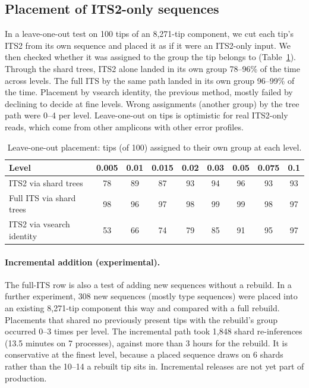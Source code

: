 \documentclass[11pt,a4paper]{article}
\begin{document}
\subsection{Placement of ITS2-only sequences}\label{sec:res-placement}

In a leave-one-out test on 100 tips of an 8,271-tip component, we cut each tip's ITS2 from its own
sequence and placed it as if it were an ITS2-only input. We then checked whether it was assigned to
the group the tip belongs to (Table~\ref{tab:placement}). Through the shard trees, ITS2 alone
landed in its own group 78--96\% of the time across levels. The full ITS by the same path landed in
its own group 96--99\% of the time. Placement by vsearch identity, the previous method, mostly
failed by declining to decide at fine levels. Wrong assignments (another group) by the tree path
were 0--4 per level. Leave-one-out on tips is optimistic for real ITS2-only reads, which come from
other amplicons with other error profiles.

\begin{table}[t]
\centering\small
\caption{Leave-one-out placement: tips (of 100) assigned to their own group at each level.}
\label{tab:placement}
\begin{tabular}{@{}lcccccccc@{}}
\toprule
Level & 0.005 & 0.01 & 0.015 & 0.02 & 0.03 & 0.05 & 0.075 & 0.1 \\
\midrule
ITS2 via shard trees & 78 & 89 & 87 & 93 & 94 & 96 & 93 & 93 \\
Full ITS via shard trees & 98 & 96 & 97 & 98 & 99 & 99 & 98 & 97 \\
ITS2 via vsearch identity & 53 & 66 & 74 & 79 & 85 & 91 & 95 & 97 \\
\bottomrule
\end{tabular}
\end{table}

\paragraph{Incremental addition (experimental).}
The full-ITS row is also a test of adding new sequences without a rebuild. In a further experiment,
308 new sequences (mostly type sequences) were placed into an existing 8,271-tip component this way
and compared with a full rebuild. Placements that shared no previously present tips with the
rebuild's group occurred 0--3 times per level. The incremental path took 1,848 shard re-inferences
(13.5 minutes on 7 processes), against more than 3 hours for the rebuild. It is conservative at the
finest level, because a placed sequence draws on 6 shards rather than the 10--14 a rebuilt tip sits
in. Incremental releases are not yet part of production.
\end{document}
